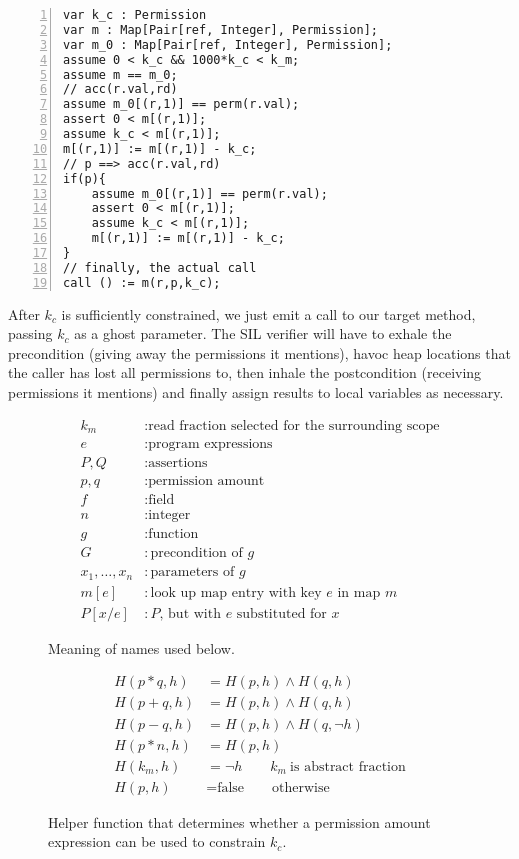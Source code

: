 \begin{lstlisting}[language=sil,float,caption={Translation sketch for a method call involving fractional read permissions and the precondition \lstinline:acc(r.val,rd) && p ==> acc(r.val):},label={lst:rdcall},numbers=left]
var k_c : Permission
var m : Map[Pair[ref, Integer], Permission];
var m_0 : Map[Pair[ref, Integer], Permission];
assume 0 < k_c && 1000*k_c < k_m;
assume m == m_0;
// acc(r.val,rd)
assume m_0[(r,1)] == perm(r.val);
assert 0 < m[(r,1)];
assume k_c < m[(r,1)];
m[(r,1)] := m[(r,1)] - k_c;
// p ==> acc(r.val,rd)
if(p){
	assume m_0[(r,1)] == perm(r.val);
	assert 0 < m[(r,1)];
	assume k_c < m[(r,1)];
	m[(r,1)] := m[(r,1)] - k_c;
}
// finally, the actual call
call () := m(r,p,k_c);
\end{lstlisting}

After $k_c$ is sufficiently constrained, we just emit a call to our target method, passing $k_c$ as a ghost parameter. 
The SIL verifier will have to 
	exhale the precondition (giving away the permissions it mentions), 
	havoc heap locations that the caller has lost all permissions to, 
	then inhale the postcondition (receiving permissions it mentions) 
	and finally assign results to local variables as necessary.

\begin{figure}
\begin{align*}
	k_m &: \text{read fraction selected for the surrounding scope} \\
	e &: \text{program expressions} \\
	P,Q &: \text{assertions} \\
	p,q 	&: \text{permission amount} \\
	f 	&: \text{field} \\
	n 	&: \text{integer} \\
	g 	&: \text{function} \\
	G 	&: \text{precondition of $g$} \\
	x_1,\dotsc,x_n &: \text{parameters of $g$} \\
	m[e] &: \text{look up map entry with key $e$ in map $m$} \\
	P[x/e] &: \text{$P$, but with $e$ substituted for $x$}
\end{align*}
\caption{Meaning of names used below.}
\end{figure}

\begin{figure}
\begin{align*}
	H(p * q,h) 	&= H(p,h) \land H(q,h) \\
	H(p + q,h) 	&= H(p,h) \land H(q,h) \\
	H(p - q,h) 	&= H(p,h) \land H(q,¬h) \\
	H(p * n,h) 	&= H(p,h) \\
	H(k_m,h)		&= ¬h \qquad k_m\ \text{is abstract fraction}\\
	H(p,h) &= \text{false} \qquad \text{otherwise}
\end{align*}
\caption{Helper function that determines whether a permission amount expression can be used to constrain $k_c$.}
\end{figure}

